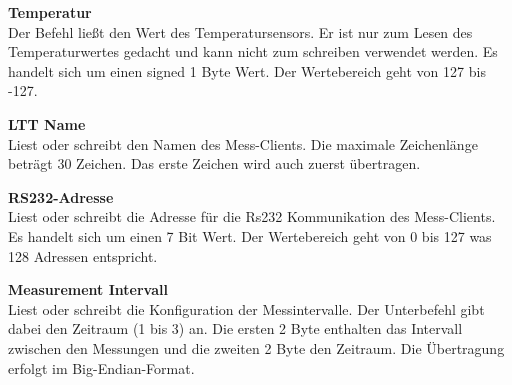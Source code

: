 \textbf{Temperatur}\\
Der Befehl ließt den Wert des Temperatursensors. Er ist nur zum Lesen des Temperaturwertes gedacht und kann nicht zum schreiben verwendet werden. Es handelt sich um einen signed 1 Byte Wert. Der Wertebereich geht von 127 bis -127.\ 

\textbf{LTT Name}\\
Liest oder schreibt den Namen des Mess-Clients. Die maximale Zeichenlänge beträgt 30 Zeichen. Das erste Zeichen wird auch zuerst übertragen.\ 

\textbf{RS232-Adresse}\\
Liest oder schreibt die Adresse für die Rs232 Kommunikation des Mess-Clients. Es handelt sich um einen 7 Bit Wert. Der Wertebereich geht von 0 bis 127 was 128 Adressen entspricht.\ 

\textbf{Measurement Intervall}\\
Liest oder schreibt die Konfiguration der Messintervalle. Der Unterbefehl gibt dabei den Zeitraum (1 bis 3) an. Die ersten 2 Byte enthalten das Intervall zwischen den Messungen und die zweiten 2 Byte den Zeitraum. Die Übertragung erfolgt im Big-Endian-Format.\ 

